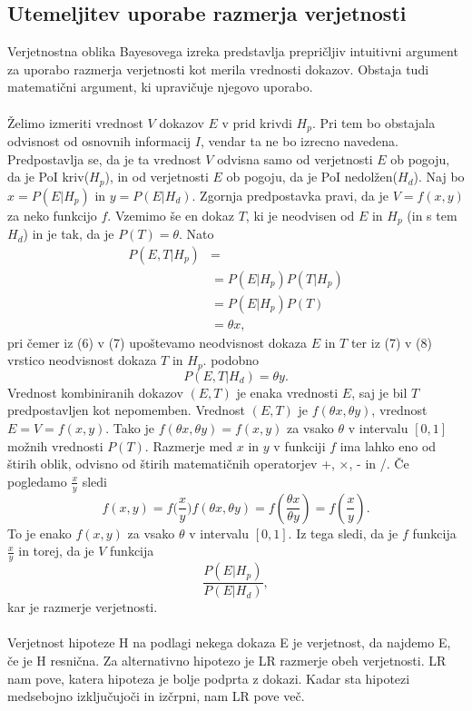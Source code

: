 \documentclass[12pt,a4paper]{amsart}
\theoremstyle{definition} %
\theoremstyle{plain} %
\begin{document}
\subsection{Utemeljitev uporabe razmerja verjetnosti}
Verjetnostna oblika Bayesovega izreka predstavlja prepričljiv intuitivni argument za uporabo razmerja verjetnosti kot merila vrednosti dokazov. 
Obstaja tudi matematični argument, ki upravičuje njegovo uporabo.\\\\
Želimo izmeriti vrednost $V$ dokazov $E$ v prid krivdi $H_p$. Pri tem bo obstajala odvisnost od osnovnih informacij $I$, vendar ta ne bo izrecno 
navedena. Predpostavlja se, da je ta vrednost $V$ odvisna samo od verjetnosti $E$ ob pogoju, da je PoI kriv($H_p$), in od verjetnosti $E$ ob pogoju, 
da je PoI nedolžen($H_d$). Naj bo $x=P(E \lvert H_p)$ in $y=P(E \lvert H_d)$. Zgornja predpostavka pravi, da je $V = f (x, y)$ za neko funkcijo $f$. 
Vzemimo še en dokaz $T$, ki je neodvisen od $E$ in $H_p$ (in s tem $H_d$) in je tak, da je $P(T) = \theta$. Nato
\begin{align}
    P(E,T \lvert H_p) & = \\
    & = P(E \lvert H_p)P(T \lvert H_p) \\
    & = P(E \lvert H_p)P(T)\\
    & = \theta x, 
\end{align}
pri čemer iz (6) v (7) upoštevamo neodvisnost dokaza $E$ in $T$ ter iz (7) v (8) vrstico neodvisnost dokaza $T$ in $H_p$. podobno
\[
    P(E,T \lvert H_d)  = \theta y.
\]
Vrednost kombiniranih dokazov $(E, T)$ je enaka vrednosti $E$, saj je bil $T$ predpostavljen kot nepomemben. Vrednost $(E, T)$ je $f(\theta x, \theta y)$, 
vrednost $E = V = f (x, y)$. Tako je $f(\theta x, \theta y) = f(x,y)$ za vsako $\theta$ v intervalu $[0,1]$ možnih vrednosti $P(T)$. Razmerje med 
$x$ in $y$ v funkciji $f$ ima lahko eno od štirih oblik, odvisno od štirih matematičnih operatorjev +, ×, - in /. Če pogledamo $\frac{x}{y}$ sledi
\[
    f(x,y) = f \big(\frac{x}{y}\big)
    f(\theta x, \theta y) = f(\frac{\theta x}{\theta y}) = f(\frac{x}{y}).
\]
To je enako $f(x,y)$ za vsako $\theta$ v intervalu $[0,1]$. Iz tega sledi, da je $f$ funkcija $\frac{x}{y}$ in torej, da je $V$ funkcija
\[
    \frac{P(E \lvert H_p)}{P(E \lvert H_d)},
\]
kar je razmerje verjetnosti.\\\\
Verjetnost hipoteze H na podlagi nekega dokaza E je verjetnost, da najdemo E, če je H resnična. Za alternativno hipotezo je LR razmerje obeh 
verjetnosti. LR nam pove, katera hipoteza je bolje podprta z dokazi. Kadar sta hipotezi medsebojno izključujoči in izčrpni, nam LR pove več. 
\end{document}
